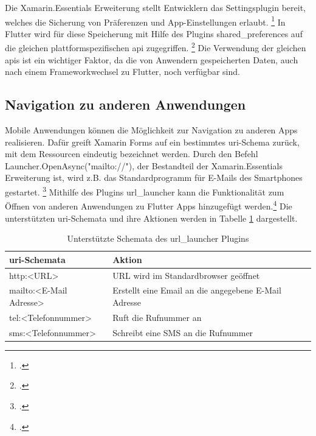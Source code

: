 Die Xamarin.Essentials Erweiterung stellt Entwicklern das \glq Settingsplugin\grq{} bereit, welches die Sicherung von Präferenzen und App-Einstellungen erlaubt.  \footcite[Vgl.][Abgerufen am \today]{MicrosoftXamSettings2019} In Flutter wird für diese Speicherung mit Hilfe des Plugins \glq shared\_preferences\grq{}  auf die gleichen plattformspezifischen \ac{api} zugegriffen.  \footcite[Vgl.][Abgerufen am \today]{GoogleFlutterSharedPreferences2020}  Die Verwendung der gleichen \acp{api} ist ein wichtiger Faktor,  da die von Anwendern gespeicherten Daten,  auch nach einem Frameworkwechsel zu Flutter,  noch verfügbar sind. 

\subsection{Navigation zu anderen Anwendungen}
\label{sec:nav}

Mobile Anwendungen können die Möglichkeit zur Navigation zu anderen Apps realisieren.  Dafür greift Xamarin Forms auf ein bestimmtes \ac{uri}-Schema zurück, mit dem Ressourcen eindeutig bezeichnet werden.  Durch den Befehl \glq Launcher.OpenAsync("mailto://")\grq{}, der Bestandteil der Xamarin.Essentials Erweiterung ist,  wird z.B.  das Standardprogramm für E-Mails des Smartphones gestartet. \footcite[Vgl.][Abgerufen am \today]{MicrosoftLauncher2020}  Mithilfe des Plugins \glq url\_launcher\grq{} kann die Funktionalität zum Öffnen von anderen Anwendungen zu Flutter Apps hinzugefügt werden.\footcite[Vgl.][Abgerufen am \today]{Googleurllauncher2020} Die unterstützten \ac{uri}-Schemata und ihre Aktionen werden in Tabelle \ref{tab:URISChema} dargestellt.

\begin{table}[!ht]
\begin{tabularx}{\textwidth}{X|X}
   \textbf{\ac{uri}-Schemata} & \textbf{Aktion}  \\
\hline
	http:<URL>		       				&  	URL wird im Standardbrowser geöffnet 		\\ 
	mailto:<E-Mail Adresse>		       		&  	Erstellt eine Email an die angegebene E-Mail Adresse 		\\ 
	tel:<Telefonnummer>	       		&  	Ruft die Rufnummer an 		\\ 
	sms:<Telefonnummer>		       		&  	Schreibt eine SMS an die Rufnummer		\\ 
\end{tabularx}
\caption{Unterstützte Schemata des \glq url\_launcher\grq{} Plugins}
 \label{tab:URISChema}
\end{table}


